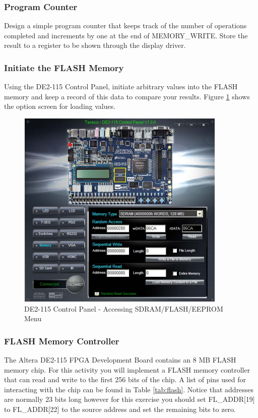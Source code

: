 \subsubsection{Program Counter}

Design a simple program counter that keeps track of the number of operations completed and increments by one at the end of MEMORY\_WRITE. Store the result to a register to be shown through the display driver.

\subsubsection{Initiate the FLASH Memory}

Using the DE2-115 Control Panel, initiate arbitrary values into the FLASH memory and keep a record of this data to compare your results. Figure \ref{fig:controlpanel} shows the option screen for loading values. 

\begin{figure}[H]
	\centering
	\includegraphics[width=100mm]{Lab5/figures/controlpanel.png}
	\caption{DE2-115 Control Panel - Accessing SDRAM/FLASH/EEPROM Menu}
	\label{fig:controlpanel}
\end{figure}

\subsubsection{FLASH Memory Controller}
The Altera DE2-115 FPGA Development Board contains an 8 MB FLASH memory chip. For this activity you will implement a FLASH memory controller that can read and write to the first 256 bits of the chip. A list of pins used for interacting with the chip can be found in Table \ref{tab:flash}. Notice that addresses are normally 23 bits long however for this exercise you should set FL\_ADDR[19] to FL\_ADDR[22] to the source address and set the remaining bits to zero. 

